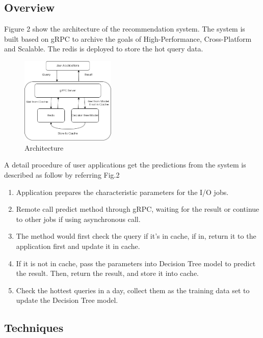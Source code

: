 \documentclass[conference]{IEEEtran}
\begin{document}
\subsection{Overview}
Figure 2 show the architecture of the recommendation system. The system is built based on gRPC 
to archive the goals of High-Performance, Cross-Platform and Scalable. The redis is deployed to store the hot query data.

\begin{figure}[htbp]
        \centering
        \includegraphics[width=0.4\textwidth]{architecture.png}
        \caption{Architecture}
\end{figure}

A detail procedure of user applications get the predictions from the system is described as follow by referring Fig.2
\begin{enumerate}
    \item Application prepares the characteristic parameters for the I/O jobs.
    \item Remote call predict method through gRPC, waiting for the result or continue to other jobs if using asynchronous call.
    \item The method would first check the query if it's in cache, if in, return it to the application first and update it in cache.
    \item If it is not in cache, pass the parameters into Decision Tree model to predict the result. Then, return the result, and store it into cache.
    \item Check the hottest queries in a day, collect them as the training data set to update the Decision Tree model.
\end{enumerate}


\subsection{Techniques}
\end{document}
